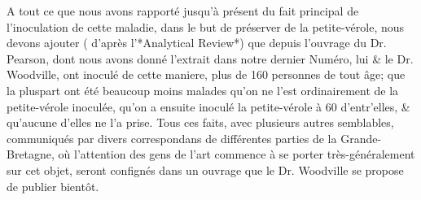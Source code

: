 A tout ce que nous avons rapporté jusqu’à présent du fait principal de l’inoculation de cette maladie, dans le but de préserver de la petite-vérole, nous devons ajouter ( d’après l’*Analytical Review*) que depuis l’ouvrage du Dr. Pearson, dont nous avons donné l’extrait dans notre dernier Numéro, lui & le Dr. Woodville, ont inoculé de cette maniere, plus de 160 personnes de tout âge; que la pluspart ont été beaucoup moins malades qu’on ne l’est ordinairement de la petite-vérole inoculée, qu’on a ensuite inoculé la petite-vérole à 60 d’entr’elles, & qu’aucune d’elles ne l’a prise. Tous ces faits, avec plusieurs autres semblables, communiqués par divers correspondans de différentes parties de la Grande-Bretagne, où l’attention des gens de l’art commence à se porter très-généralement sur cet objet, seront confignés dans un ouvrage que le Dr. Woodville se propose de publier bientôt.
